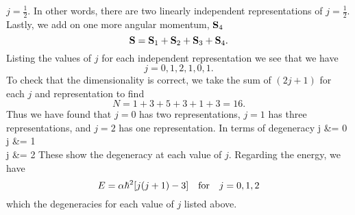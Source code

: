 \documentclass[11pt,letterpaper]{article}
\begin{document}
\begin{enumerate}[label=\Roman*.]
		$j=\frac{1}{2}$. In other words, there are two linearly independent representations of $j=\frac{1}{2}$. Lastly, we add on
		one more angular momentum, $\mathbf{S}_4$
		\[
			\mathbf{S} = \mathbf{S}_1+\mathbf{S}_2+\mathbf{S}_3 +\mathbf{S}_4.
		\]
		Listing the values of $j$ for each independent representation we see that we have
		\[
			j = 0,1,2,1,0,1.
		\]
		To check that the dimensionality is correct, we take the sum of $(2j+1)$ for each $j$ and representation to find
		\[
			N = 1+3+5+3+1+3 = 16.
		\]
		Thus we have found that $j=0$ has two representations, $j=1$ has three representations, and $j=2$ has one representation. 
		In terms of degeneracy
		\ba
			j &= 0  \\
			j &= 1  \\
			j &= 2  
		\ea 
		These show the degeneracy at each value of $j$. Regarding the energy, we have
		\[
			E = \alpha\hbar^2[j(j+1)-3]\quad\text{for}\quad j = 0,1,2
		\]
		which the degeneracies for each value of $j$ listed above. 
		\\
		\\
	\eenum
	

\end{enumerate}
\end{document}
